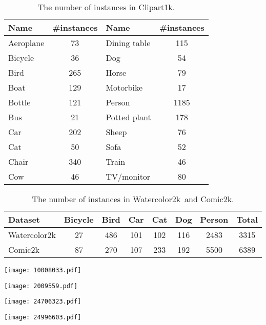 \documentclass[10pt,twocolumn,letterpaper]{article}
\newcommand{\datasetclipart}{Clipart1k}
\newcommand{\datasetwatercolor}{Watercolor2k}
\newcommand{\datasetcomic}{Comic2k}
\begin{document}
\begin{table}[t]
  \caption{The number of instances in \datasetclipart.}
  \label{tbl:statistics_20class}
  \centering
  \tabcolsep=2pt
  \begin{tabular}{@{}lc@{\hskip 0.5cm}lc@{}} \toprule
    Name & \#instances & Name & \#instances \\ \midrule
   	Aeroplane & 73 & Dining table & 115 \\
    Bicycle & 36 & Dog & 54 \\ 
    Bird & 265 & Horse & 79\\
    Boat & 129 & Motorbike & 17\\
    Bottle & 121 & Person & 1185\\
    Bus & 21 & Potted plant & 178\\
    Car & 202 & Sheep & 76\\
    Cat & 50 & Sofa & 52\\
    Chair & 340 & Train & 46\\
    Cow & 46 & TV/monitor & 80\\
    \bottomrule
  \end{tabular}
\end{table}
 \begin{table}[t]
  \caption{The number of instances in \datasetwatercolor~and \datasetcomic.}
  \label{tbl:statistics_6class}
  \centering
  \tabcolsep=2pt
  \begin{tabular}{@{}lccccccc@{}} \toprule
    Dataset & Bicycle & Bird & Car & Cat & Dog & Person & Total \\ \midrule
    \datasetwatercolor & 27 & 486 & 101 & 102 & 116 & 2483 & 3315 \\
    \datasetcomic  & 87 & 270 & 107 & 233 & 192 & 5500 & 6389 \\ \bottomrule
  \end{tabular}
\end{table}
 
\begin{figure*}[t]
  \begin{minipage}[t]{0.265\hsize}
  	  \centering
  	  \texttt{[image: 10008033.pdf]}
  	  \label{subfig:a}
  \end{minipage}
  \hfill
  \begin{minipage}[t]{0.265\hsize}
  	\texttt{[image: 2009559.pdf]}
  	\label{subfig:b}
  \end{minipage}
  \hfill
  \hfill
  \hfill
  \begin{minipage}[t]{0.175\hsize}
  	\texttt{[image: 24706323.pdf]}
  	\label{subfig:c}
  \end{minipage}
  \hfill
  \begin{minipage}[t]{0.225\hsize}
  	\texttt{[image: 24996603.pdf]}
  	\label{subfig:d}
  \end{minipage}
  \caption{Typical detection errors by DT+PA using SSD300 as the baseline FSD. The images are from the test set of \datasetclipart~and \datasetcomic. }
\label{fig:visualization_of_typical_errors}
\end{figure*}
\end{document}

